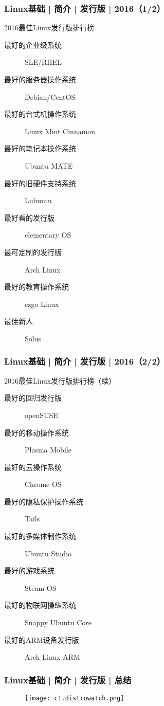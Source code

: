 \begin{frame}
  \frametitle{Linux基础 | 简介 | 发行版 | 2016（1/2）}
  \begin{block}{2016最佳Linux发行版排行榜}
  \begin{description}
    \item[最好的企业级系统] SLE/RHEL
    \item[最好的服务器操作系统] Debian/CentOS
    \item[最好的台式机操作系统] Linux Mint Cinnamon
    \item[最好的笔记本操作系统] Ubuntu MATE
    \item[最好的旧硬件支持系统] Lubuntu
    \item[最好看的发行版] elementary OS
    \item[最可定制的发行版] Arch Linux
    \item[最好的教育操作系统] ezgo Linux
    \item[最佳新人] Solus
  \end{description}
  \end{block}
\end{frame}

\begin{frame}
  \frametitle{Linux基础 | 简介 | 发行版 | 2016（2/2）}
  \begin{block}{2016最佳Linux发行版排行榜（续）}
  \begin{description}
    \item[最好的回归发行版] openSUSE
    \item[最好的移动操作系统] Plasma Mobile
    \item[最好的云操作系统] Chrome OS
    \item[最好的隐私保护操作系统] Tails
    \item[最好的多媒体制作系统] Ubuntu Studio
    \item[最好的游戏系统] Steam OS
    \item[最好的物联网操纵系统] Snappy Ubuntu Core
    \item[最好的ARM设备发行版] Arch Linux ARM
  \end{description}
  \end{block}
\end{frame}

\begin{frame}
  \frametitle{Linux基础 | 简介 | 发行版 | 总结}
  \begin{figure}
    \centering
    \texttt{[image: c1.distrowatch.png]}
  \end{figure}
\end{frame}

